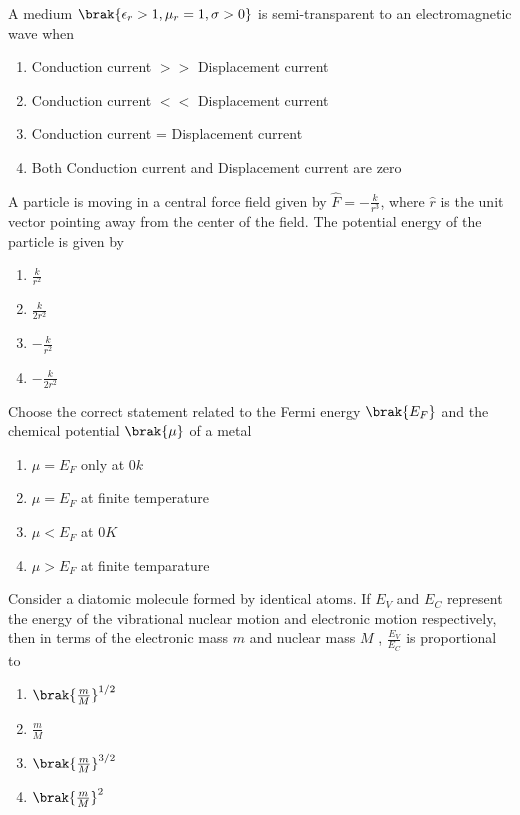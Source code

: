 	\item A medium $\brak{\epsilon_r > 1, \mu_r =1,\sigma >0}$ is semi-transparent to an electromagnetic wave when
		\begin{enumerate}
			\item Conduction current $>>$ Displacement current
			\item Conduction current $<<$ Displacement current
			\item Conduction current = Displacement current
			\item Both Conduction current and Displacement current are zero
		\end{enumerate}
	\item A particle is moving in a central force field given by $\hat{F} =-\frac{k}{r^3}$, where $\hat{r}$ is the unit vector pointing away from the center of the field. The potential energy of the particle is given by
		\begin{enumerate}
			\item $\frac{k}{r^2}$
			\item $\frac{k}{2r^2}$
			\item $-\frac{k}{r^2}$
			\item $-\frac{k}{2r^2}$
		\end{enumerate}
	\item Choose the correct statement related to the Fermi energy $\brak{E_F}$ and the chemical potential $\brak{\mu}$ of a metal
		\begin{enumerate}
			\item $\mu = E_F$ only at $0k$
			\item $\mu = E_F$ at finite temperature
			\item $\mu< E_F$ at $0K$
			\item $\mu > E_F$ at finite temparature
		\end{enumerate}
	\item Consider a diatomic molecule formed by identical atoms. If $E_V$ and $E_C$ represent the energy of the vibrational nuclear motion and electronic motion respectively, then in terms of the electronic mass $m$ and nuclear mass $M$ , $\frac{E_V}{E_C}$ is proportional to
		\begin{enumerate}
			\item $\brak{\frac{m}{M}}^{1/2}$
			\item $\frac{m}{M}$
			\item $\brak{\frac{m}{M}}^{3/2}$
			\item $\brak{\frac{m}{M}}^2$
		\end{enumerate}
